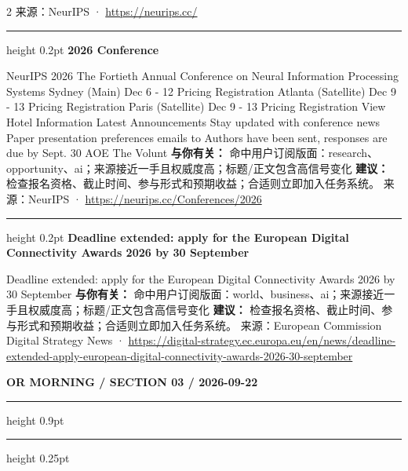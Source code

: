 \documentclass[10.5pt]{ctexart}
\begin{document}
\begin{multicols}{2}
{\footnotesize\color{ormuted} 来源：NeurIPS · \url{https://neurips.cc/}}
\vspace{2mm}
\hrule height 0.2pt
\vspace{2mm}
{\large\bfseries 2026 Conference}\par
NeurIPS 2026 The Fortieth Annual Conference on Neural Information Processing Systems Sydney (Main) Dec 6 - 12 Pricing Registration Atlanta (Satellite) Dec 9 - 13 Pricing Registration Paris (Satellite) Dec 9 - 13 Pricing Registration View Hotel Information Latest Announcements Stay updated with conference news Paper presentation preferences emails to Authors have been sent, responses are due by Sept. 30 AOE The Volunt
\textbf{与你有关：} 命中用户订阅版面：research、opportunity、ai；来源接近一手且权威度高；标题/正文包含高信号变化
\textbf{建议：} 检查报名资格、截止时间、参与形式和预期收益；合适则立即加入任务系统。
{\footnotesize\color{ormuted} 来源：NeurIPS · \url{https://neurips.cc/Conferences/2026}}
\vspace{2mm}
\hrule height 0.2pt
\vspace{2mm}
{\large\bfseries Deadline extended: apply for the European Digital Connectivity Awards 2026 by 30 September}\par
Deadline extended: apply for the European Digital Connectivity Awards 2026 by 30 September
\textbf{与你有关：} 命中用户订阅版面：world、business、ai；来源接近一手且权威度高；标题/正文包含高信号变化
\textbf{建议：} 检查报名资格、截止时间、参与形式和预期收益；合适则立即加入任务系统。
{\footnotesize\color{ormuted} 来源：European Commission Digital Strategy News · \url{https://digital-strategy.ec.europa.eu/en/news/deadline-extended-apply-european-digital-connectivity-awards-2026-30-september}}
\end{multicols}
\newpage
{\small\bfseries OR MORNING / SECTION 03 / 2026-09-22}
\vspace{2mm}
\hrule height 0.9pt
\vspace{1.5mm}
\hrule height 0.25pt
\vspace{4mm}
\end{document}
